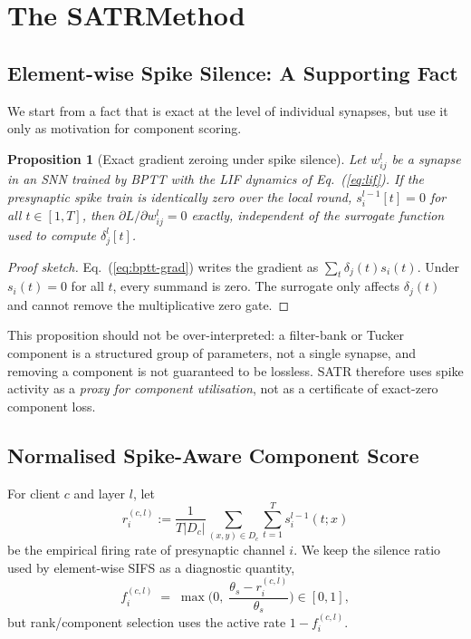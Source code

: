\documentclass{article} %
\newcommand{\method}{SATR\xspace}
\newcommand{\methodbf}{\textbf{SATR}}
\newtheorem{proposition}{Proposition}
\begin{document}
\section{The \methodbf Method}
\label{sec:method}

\subsection{Element-wise Spike Silence: A Supporting Fact}
\label{sec:method-silence}

We start from a fact that is exact at the level of individual synapses, but use it only as motivation for component scoring.
\begin{proposition}[Exact gradient zeroing under spike silence]
\label{prop:exact-zero}
Let $w_{ij}^l$ be a synapse in an SNN trained by BPTT with the LIF dynamics of Eq.~(\ref{eq:lif}). If the presynaptic spike train is identically zero over the local round, $s_i^{l-1}[t]=0$ for all $t \in [1,T]$, then $\partial L / \partial w_{ij}^l = 0$ exactly, independent of the surrogate function used to compute $\delta_j^l[t]$.
\end{proposition}
\begin{proof}[Proof sketch]
Eq.~(\ref{eq:bptt-grad}) writes the gradient as $\sum_t \delta_j(t)s_i(t)$. Under $s_i(t)=0$ for all $t$, every summand is zero. The surrogate only affects $\delta_j(t)$ and cannot remove the multiplicative zero gate.
\end{proof}

This proposition should not be over-interpreted: a filter-bank or Tucker component is a structured group of parameters, not a single synapse, and removing a component is not guaranteed to be lossless. \method therefore uses spike activity as a \emph{proxy for component utilisation}, not as a certificate of exact-zero component loss.

\subsection{Normalised Spike-Aware Component Score}
\label{sec:method-score}

For client $c$ and layer $l$, let
\begin{equation}
r_i^{(c,l)} := \frac{1}{T|D_c|}\sum_{(x,y)\in D_c}\sum_{t=1}^{T} s_i^{l-1}(t;x)
\label{eq:spike-rate}
\end{equation}
be the empirical firing rate of presynaptic channel $i$. We keep the silence ratio used by element-wise SIFS as a diagnostic quantity,
\begin{equation}
f_i^{(c,l)} \;=\; \max\!\Big(0,\; \frac{\theta_s-r_i^{(c,l)}}{\theta_s}\Big) \in [0,1],
\label{eq:silence-ratio}
\end{equation}
but rank/component selection uses the active rate $1-f_i^{(c,l)}$.
\end{document}
